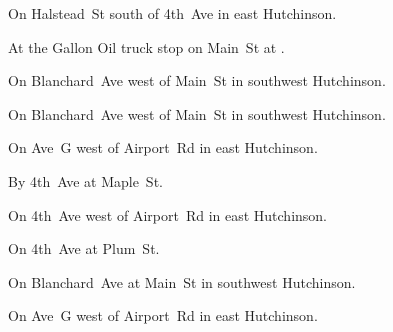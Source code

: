 

\begin{LocationList}

On Halstead~St south of 4th~Ave in east Hutchinson.

At the Gallon Oil truck stop on   Main~St at .

On Blanchard~Ave west of Main~St in southwest Hutchinson.

On Blanchard~Ave west of Main~St in southwest Hutchinson.

On Ave~G west of Airport~Rd in east Hutchinson.

By 4th~Ave at Maple~St.

On 4th~Ave west of Airport~Rd in east Hutchinson.

On 4th~Ave at Plum~St.

\Location{\TruckService \Service \Rest}
On Blanchard~Ave at Main~St in southwest Hutchinson.

On Ave~G west of Airport~Rd in east Hutchinson.

\end{LocationList}
